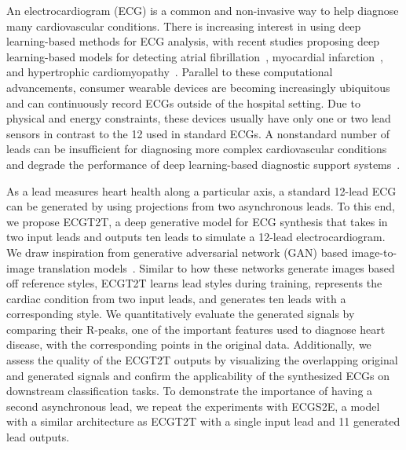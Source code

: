 An electrocardiogram (ECG) is a common and non-invasive way to help diagnose many cardiovascular conditions. There is increasing interest in using deep learning-based methods for ECG analysis, with recent studies proposing deep learning-based models for detecting atrial fibrillation~\cite{han19}, myocardial infarction~\cite{bal19}, and hypertrophic cardiomyopathy~\cite{ko20}. Parallel to these computational advancements, consumer wearable devices are becoming increasingly ubiquitous and can continuously record ECGs outside of the hospital setting. Due to physical and energy constraints, these devices usually have only one or two lead sensors in contrast to the 12 used in standard ECGs. A nonstandard number of leads can be insufficient for diagnosing more complex cardiovascular conditions and degrade the performance of deep learning-based diagnostic support systems~\cite{cho20}.



As a lead measures heart health along a particular axis, a standard 12-lead ECG can be generated by using projections from two asynchronous leads. To this end, we propose \textsf{ECGT2T}, a deep generative model for ECG synthesis that takes in two input leads and outputs ten leads to simulate a 12-lead electrocardiogram. We draw inspiration from generative adversarial network (GAN) based image-to-image translation models~\cite{hua17,kar2019}. Similar to how these networks generate images based off reference styles, ECGT2T learns lead styles during training, represents the cardiac condition from two input leads, and generates ten leads with a corresponding style. We quantitatively evaluate the generated signals by comparing their R-peaks, one of the important features used to diagnose heart disease, with the corresponding points in the original data. Additionally, we assess the quality of the ECGT2T outputs by visualizing the overlapping original and generated signals and confirm the applicability of the synthesized ECGs on downstream classification tasks. To demonstrate the importance of having a second asynchronous lead, we repeat the experiments with ECGS2E, a model with a similar architecture as ECGT2T with a single input lead and 11 generated lead outputs.


